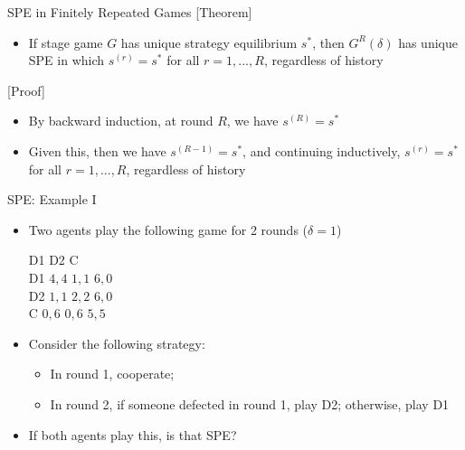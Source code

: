 \documentclass[11pt,aspectratio=169]{beamer}
\begin{document}
  \begin{frame}{SPE in Finitely Repeated Games}
   \alert{[Theorem]}
   \begin{itemize}
    \item If stage game $G$ has unique strategy equilibrium $s^{*}$, then $G^{R}(\delta)$ has unique SPE in which $s^{(r)} =s^{*} $ for all $r = 1, ..., R$, regardless of history
   \end{itemize}
   \vspace{1em}   
   \alert{[Proof]}
   \begin{itemize}
    \item By backward induction, at round $R$, we have $s^{(R)} = s^{*}$
    \item Given this, then we have $s^{(R - 1)} = s^{*}$, and continuing inductively, $s^{(r)} = s^{*}$ for all $r = 1, ..., R$, regardless of history
   \end{itemize}
  \end{frame}

  \begin{frame}{SPE: Example I}
   \begin{itemize}[<+->]
    \item Two agents play the following game for 2 rounds ($\delta = 1$)
    \begin{center}
     \hspace{-3.5em}
     \begin{game}{3}{3}
      		\> D1		\> D2		\> C			\\
      D1		\> $4, 4$	\> $1, 1$	\> $6, 0$	\\
      D2		\> $1, 1$	\> $2, 2$	\> $6, 0$	\\
      C		\> $0, 6$	\> $0, 6$	\> $5, 5$
     \end{game}
    \end{center}
    \vspace{0.7em}  
    \item Consider the following strategy:
    \begin{itemize}[<.->]
     \item In round 1, cooperate;
     \item In round 2, if someone defected in round 1, play D2; otherwise, play D1
    \end{itemize}
    \item If both agents play this, is that SPE?
   \end{itemize}
  \end{frame}  
 
\end{document}
